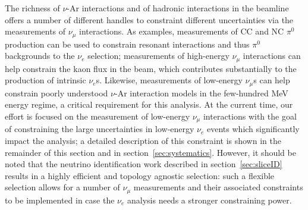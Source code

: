 \documentclass[a4paper]{article}
\begin{document}

\par The richness of $\nu$-Ar interactions and of hadronic interactions in the beamline offers a number of different handles 
to constraint different uncertainties via the measurements of $\nu_{\mu}$ interactions.
As examples, measurements of CC and NC $\pi^0$ production can be used to constrain resonant interactions and thus $\pi^0$ backgrounds to the $\nu_e$ selection;  measurements of high-energy $\nu_{\mu}$ interactions can help constrain the kaon flux in the beam, which contributes substantially to the production of intrinsic $\nu_e$s. Likewise, measurements of low-energy $\nu_{\mu}$s can help constrain poorly understood $\nu$-Ar interaction models in the few-hundred MeV energy regime, a critical requirement for this analysis.  At the current time, our effort is focused on the measurement of low-energy $\nu_{\mu}$ interactions with the goal of constraining the large uncertainties in low-energy $\nu_e$ events which significantly impact the analysis; a detailed  description of this constraint is shown in the remainder of this section and in section~\ref{sec:systematics}.
However, it should be noted that the neutrino identification work described in section~\ref{sec:sliceID} results in a highly efficient and topology agnostic selection: such a flexible selection allows for a number of $\nu_{\mu}$ measurements and their associated constraints to be implemented in case the $\nu_e$ analysis needs a stronger constraining power. 
\end{document}
